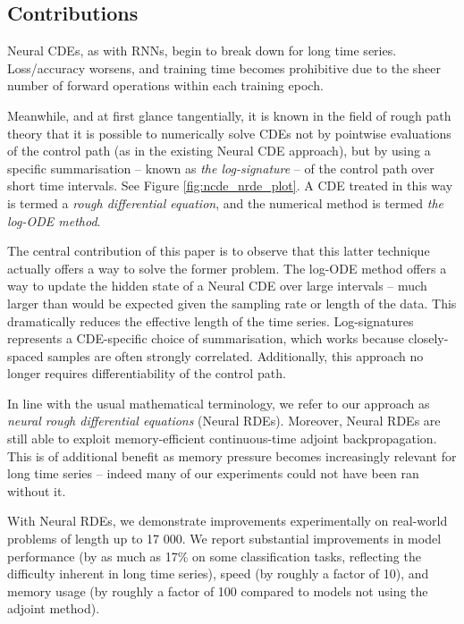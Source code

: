 \documentclass{article}
\begin{document}
\subsection{Contributions}
Neural CDEs, as with RNNs, begin to break down for long time series. Loss/accuracy worsens, and training time becomes prohibitive due to the sheer number of forward operations within each training epoch.

Meanwhile, and at first glance tangentially, it is known in the field of rough path theory \cite{lyons1998differential, lyons2004differential, friz2010multidimensional} that it is possible to numerically solve CDEs not by pointwise evaluations of the control path (as in the existing Neural CDE approach), but by using a specific summarisation -- known as \emph{the log-signature} -- of the control path over short time intervals. See Figure \ref{fig:ncde_nrde_plot}. A CDE treated in this way is termed a \textit{rough differential equation}, and the numerical method is termed \textit{the log-ODE method}.

The central contribution of this paper is to observe that this latter technique actually offers a way to solve the former problem. The log-ODE method offers a way to update the hidden state of a Neural CDE over large intervals -- much larger than would be expected given the sampling rate or length of the data. This dramatically reduces the effective length of the time series. Log-signatures represents a CDE-specific choice of summarisation, which works because closely-spaced samples are often strongly correlated. Additionally, this approach no longer requires differentiability of the control path.

In line with the usual mathematical terminology, we refer to our approach as \textit{neural rough differential equations} (Neural RDEs). Moreover, Neural RDEs are still able to exploit memory-efficient continuous-time adjoint backpropagation. This is of additional benefit as memory pressure becomes increasingly relevant for long time series -- indeed many of our experiments could not have been ran without it.

With Neural RDEs, we demonstrate improvements experimentally on real-world problems of length up to 17 000. We report substantial improvements in model performance (by as much as 17\% on some classification tasks, reflecting the difficulty inherent in long time series), speed (by roughly a factor of 10), and memory usage (by roughly a factor of 100 compared to models not using the adjoint method).
\end{document}

